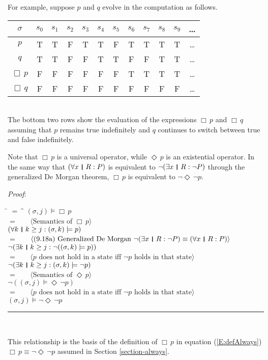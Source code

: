 \documentclass[12pt, fleqn, leqno]{article}
\newcommand{\lgap}{2pt}                             %
\newcommand{\lllgap}{12pt}                          %
\newcommand{\mymathindent}{24pt}                    %
\newcommand{\Event}{\Diamond\,}
\newcommand{\Always}{\Box\,}
\newcommand{\myqed}{\rule[-.23ex]{1.2ex}{2.0ex}}
\newcommand{\myqedtab}{\hspace{384pt}}              %
\newcommand{\thedr}{\rule[-.25ex]{.32mm}{1.75ex}}   %
\newcommand{\dr}{\;\,\thedr\,\;}                    %
\newcommand{\rb}{:}                                 %
\newcommand{\all}{\forall}                          %
\newcommand{\ext}{\exists}                          %
\newcommand{\Gll} {\langle}                         %
\newcommand{\Ggg} {\rangle}                         %
\newcommand{\Hint}[1]     {\ \ \ $\Gll              \mbox{#1} \Ggg$ }   %
\begin{document}
For example, suppose $p$ and $q$ evolve in the computation as follows.\\[\lllgap]
\begin{tabular}{c|ccccccccccc}
  $\sigma$       & $s_0$ & $s_1$ & $s_2$ & $s_3$ & $s_4$ & $s_5$ & $s_6$ & $s_7$ & $s_8$& $s_9$  & \dots \\
  \hline
  $p$            & T     & T     & F     & T     & T     & F     & T     & T     & T     & T     &  \dots\\
  $q$            & T     & T     & F     & F     & T     & T     & F     & F     & T     & T     &  \dots\\
  $\Always p$    & F     & F     & F     & F     & F     & F     & T     & T     & T     & T     &  \dots\\
  $\Always q$    & F     & F     & F     & F     & F     & F     & F     & F     & F     & F     &  \dots\\
\end{tabular}\\[\lllgap]
The bottom two rows show the evaluation of the expressions $\Always p$ and $\Always q$
assuming that $p$ remains true indefinitely and $q$ continues to switch between true and false indefinitely.

Note that $\Always p$ is a universal operator, while $\Event p$ is an existential operator.
In the same way that $(\all x\dr R\rb P)$ is equivalent to $\neg (\ext x\dr R\rb \neg P)$ through the generalized De Morgan theorem, $\Always p$ is equivalent to $\neg\Event\neg p$.

\emph{Proof}:
\begin{tabbing}
\hspace{\mymathindent} \= $= \;$ \= \myqedtab \= \kill
	\> \>   $(\sigma, j) \models \Always p$\\[\lgap]
	\> $=$  \>  \Hint{Semantics of $\Always p$}\\[\lgap]
	\> \>   $(\all k \dr k \ge j \rb (\sigma,k) \models p)$\\[\lgap]
	\> $=$  \>  \Hint{(9.18a) Generalized De Morgan $\neg (\ext x\dr R\rb \neg P)\equiv (\all x\dr R\rb P)$}\\[\lgap]
	\> \>   $\neg (\ext k \dr k \ge j \rb \neg((\sigma,k) \models p))$\\[\lgap]
	\> $=$  \>  \Hint{$p$ does not hold in a state iff $\neg p$ holds in that state}\\[\lgap]
	\> \>   $\neg (\ext k \dr k \ge j \rb (\sigma,k) \models \neg p)$\\[\lgap]
	\> $=$  \>  \Hint{Semantics of $\Event p$}\\[\lgap]
	\> \>   $\neg ((\sigma, j) \models \Event \neg p)$\\[\lgap]
	\> $=$  \>  \Hint{$p$ does not hold in a state iff $\neg p$ holds in that state}\\[\lgap]
	\> \>   $(\sigma, j) \models \neg \Event \neg p$ \quad \myqed\\
\end{tabbing}
This relationship is the basis of the definition of $\Always p$ in equation (\ref{E:defAlways})
$\Always p \equiv \neg\Event\neg p$ assumed in Section \ref{section-always}.
\end{document}
